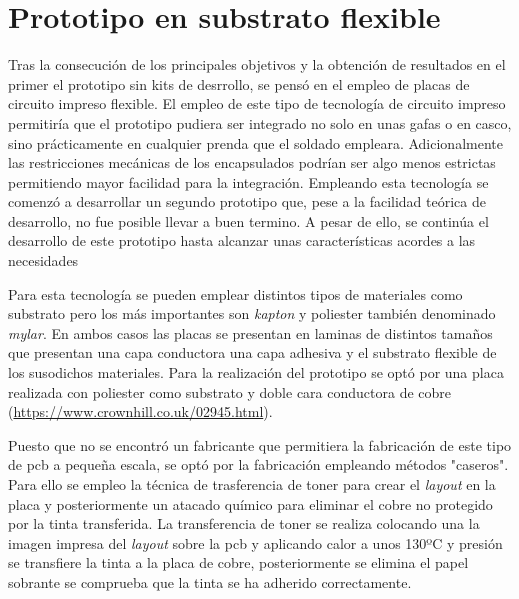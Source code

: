 \makeatletter
\def\clearpage{%
  \ifvmode
    \ifnum \@dbltopnum =\m@ne
      \ifdim \pagetotal <\topskip
        \hbox{}
      \fi
    \fi
  \fi
  \newpage
  \thispagestyle{empty}
  \write\m@ne{}
  \vbox{}
  \penalty -\@Mi
}
\makeatother



\section{Prototipo en substrato flexible}

Tras la consecución de los principales objetivos y la obtención de resultados en el primer el prototipo sin kits de desrrollo, se pensó en el empleo de placas de circuito impreso flexible. El empleo de este tipo de tecnología de circuito impreso permitiría que el prototipo pudiera ser integrado no solo en unas gafas o en casco, sino prácticamente en cualquier prenda que el soldado empleara. Adicionalmente las restricciones mecánicas de los encapsulados podrían ser algo menos estrictas permitiendo mayor facilidad para la integración. Empleando esta tecnología se comenzó a desarrollar un segundo prototipo que, pese a la facilidad teórica de desarrollo, no fue posible llevar a buen termino. A pesar de ello, se continúa el desarrollo de este prototipo hasta alcanzar unas características acordes a las necesidades


Para esta tecnología se pueden emplear distintos tipos de materiales como substrato pero los más importantes son \textit{\gls{kapton}} y poliester también denominado \textit{\gls{mylar}}. En ambos casos las placas se presentan en laminas de distintos tamaños que presentan una capa conductora una capa adhesiva y el substrato flexible de los susodichos materiales. Para la realización del prototipo se optó por una placa realizada con poliester como substrato y doble cara conductora de cobre (\url{https://www.crownhill.co.uk/02945.html}).

Puesto que no se encontró un fabricante que permitiera la fabricación de este tipo de \acrshort{pcb} a pequeña escala, se optó por la fabricación empleando métodos "caseros". Para ello se empleo la técnica de trasferencia de toner para crear el \textit{layout} en la placa y posteriormente un atacado químico para eliminar el cobre no protegido por la tinta transferida. La transferencia de toner se realiza colocando una la imagen impresa del \textit{layout} sobre la \acrshort{pcb} y aplicando calor a unos 130ºC y presión se transfiere la tinta a la placa de cobre, posteriormente se elimina el papel sobrante se comprueba que la tinta se ha adherido correctamente. 

